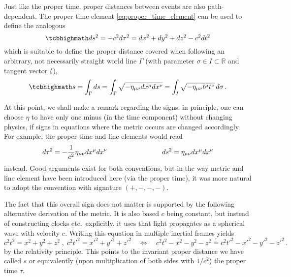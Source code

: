 \documentclass[../relativity_main.tex]{subfiles}
\begin{document}
Just like the proper time, proper distances between events are also path-dependent. The proper time element \eqref{eq:proper_time_element} can be used to define the analogous 
\begin{equation}\label{eq:proper_line_element}
	\eqbox{
	ds^2 = - c^2 d\tau^2 = dx^2 + dy^2 + dz^2 - c^2 dt^2
	} 
\end{equation}
which is suitable to define the proper distance covered when following an arbitrary, not necessarily straight world line $\Gamma$ (with parameter $\sigma \in I \subset \mathbb{R}$ and tangent vector $\underline{t}$),
\begin{equation}\label{eq:proper_distance_general}
	\eqbox{
	s = \int_\Gamma ds = \int_\Gamma \sqrt{- \eta_{\mu \nu} dx^\mu dx^\nu} = \int_I \sqrt{- \eta_{\mu \nu} t^\mu t^\nu} \, d\sigma
	} \, .
\end{equation}


At this point, we shall make a remark regarding the signs: in principle, one can choose $\eta$ to have only one minus (in the time component) without changing physics, if signs in equations where the metric occurs are changed accordingly. For example, the proper time and line elements would read
\begin{equation}
	d\tau^2 = - \frac{1}{c^2} \eta_{\mu \nu} dx^\mu dx^\nu
	\qquad \qquad \qquad \qquad
	ds^2 = \eta_{\mu \nu} dx^\mu dx^\nu
\end{equation}
instead. Good arguments exist for both conventions, but in the way metric and line element have been introduced here (via the proper time), it was more natural to adopt the convention with signature $(+, -, -, -)$.

The fact that this overall sign does not matter is supported by the following alternative derivation of the metric. It is also based $c$ being constant, but instead of constructing clocks etc.~explicitly, it uses that light propagates as a spherical wave with velocity $c$. Writing this equation in multiple inertial frames yields
\begin{equation}
	c^2 t^2 = x^2 + y^2 + z^2 \; , \; c^2 t'^2 = x'^2 + y'^2 + z'^2 \quad \Leftrightarrow \quad c^2 t^2 - x^2 - y^2 - z^2 \overset{!}{=} c^2 t'^2 - x'^2 - y'^2 - z'^2 \, .
\end{equation}
by the relativity principle. This points to the invariant proper distance we have called $s$ or equivalently (upon multiplication of both sides with $1 / c^2$) the proper time $\tau$.


\end{document}
